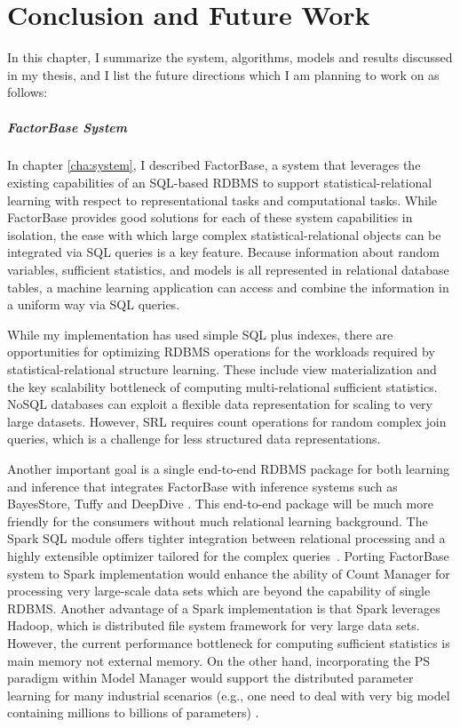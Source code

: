 \documentclass{sfuthesis}
\begin{document}
\chapter{Conclusion and Future Work} \label{cha:lim}
In this chapter, I summarize the system, algorithms, models and results discussed in my thesis, and I list the future directions which I am planning to work on as follows:

\paragraph{FactorBase System}
In chapter \ref{cha:system}, I  described FactorBase, a system that leverages the existing capabilities of an SQL-based RDBMS to support statistical-relational learning with respect to representational tasks and computational tasks. While FactorBase  provides good solutions for each of these system capabilities in isolation, the ease with which large complex statistical-relational objects can be integrated via SQL queries is a key feature. Because information about random variables, sufficient statistics, and models is all represented in relational database tables, a machine learning application can access and combine the information in a uniform way via SQL queries.

While my implementation has used simple SQL plus indexes, there are opportunities for optimizing RDBMS operations for the workloads required by statistical-relational structure learning. These include view materialization and the key scalability bottleneck of computing multi-relational sufficient statistics. NoSQL databases can exploit a flexible data representation for scaling to very large datasets. However, SRL requires count operations for random complex join queries, which is a challenge for less structured data representations. 

Another important goal is a single end-to-end RDBMS package for both learning and inference that integrates FactorBase with inference systems such as BayesStore, Tuffy and DeepDive \cite{Sa2016}.  This end-to-end package will be much more friendly for the consumers without much relational learning background. 
The Spark SQL module offers tighter integration between relational processing and a highly extensible optimizer tailored for the complex queries~\cite{Michael2015}. Porting FactorBase system to Spark implementation  would enhance the ability of Count Manager for processing very large-scale data sets which are beyond the capability of single RDBMS. 
Another advantage of a Spark implementation is that Spark leverages Hadoop, which is distributed file system framework for very large data sets. However, the current performance bottleneck for computing sufficient statistics is main memory not external memory.
On the other hand, incorporating the PS paradigm within Model Manager would support the distributed parameter learning for many industrial scenarios (e.g., one need to deal with very big model containing millions to billions of parameters) \cite{Li2014}.
\end{document}
